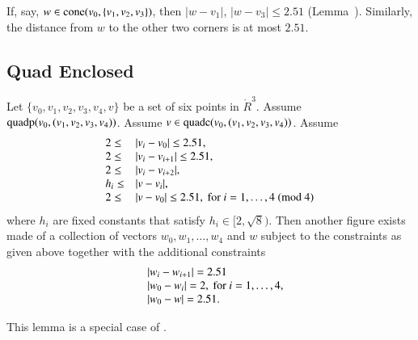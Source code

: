 \begin{tarskidata}
\begin{tarski}
\begin{proved}
If, say, $w\in {\operatorname{cone}}(v_0,\{v_1,v_2,v_3\})$, then
$|w-v_1|$, $|w-v_3|\le 2.51$ (Lemma~).
 Similarly, the distance from
$w$ to the other two corners is at most $2.51$.
\swallowed\end{proved}
\end{tarski}







\begin{tarski}
\section{Quad Enclosed}

\begin{lemma}
Let $\{v_0,v_1,v_2,v_3,v_4,v\}$ be a set of six points in
$\ring{R}^3$.  Assume ${\operatorname{quadp}}(v_0,(v_1,v_2,v_3,v_4))$.
Assume $v\in {\operatorname{quadc}}(v_0,(v_1,v_2,v_3,v_4))$.
Assume 
    $$\begin{array}{lll}
    2\le &|v_i-v_0|\le 2.51,\\
    2\le&|v_i-v_{i+1}|\le 2.51, \\
    2\le&|v_i-v_{i+2}|,\\
    h_i\le &|v-v_i|, \\
    2\le &|v-v_0|\le 2.51, \hbox{ for }
        i=1,\ldots,4 \ (\hbox{mod } 4)\\
    \end{array}
    $$
where $h_i$ are fixed constants that satisfy
$h_i\in[2,\sqrt{8})$.  
Then another figure exists made of
a collection of vectors $w_0,w_1,\ldots,w_4$ and $w$ subject to
the constraints as given above together with the additional constraints
    $$\begin{array}{lll}
    &|w_i-w_{i+1}|=2.51\\
    &|w_0-w_i|=2, \hbox { for } i=1,\ldots,4,\\
    &|w_0-w|=2.51.
    \end{array}
    $$
\end{lemma}

\begin{proved} This  lemma is a special case of
\cite[Lemma~4.3]{part1}.
\swallowed\end{proved}
\end{tarski}






\end{tarskidata}
